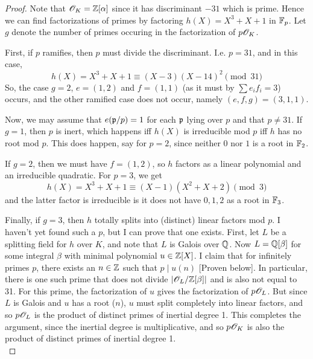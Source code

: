 \begin{proof}
	Note that $\mathscr{O}_K = \mathbb{Z}[\alpha]$ since it has discriminant $-31$ which is prime. Hence we can find factorizations of primes by factoring $h(X) = X^3+X+1$ in $\mathbb{F}_p$. Let $g$ denote the number of primes occuring in the factorization of $p\mathscr{O}_K$.
	
	First, if $p$ ramifies, then $p$ must divide the discriminant. I.e. $p=31$, and in this case,
	\[ h(X) = X^3+X+1 \equiv (X-3)(X-14)^2 \pmod{31} \]
	So, the case $g = 2$, $e = (1,2)$ and $f = (1,1)$ (as it must by $\sum e_if_i = 3$) occurs, and the other ramified case does not occur, namely $(e,f,g) = (3,1,1)$.
	
	Now, we may assume that $e(\mathfrak{p}/p) = 1$ for each $\mathfrak{p}$ lying over $p$ and that $p \neq 31$. If $g=1$, then $p$ is inert, which happens iff $h(X)$ is irreducible mod $p$ iff $h$ has no root mod $p$. This does happen, say for $p = 2$, since neither $0$ nor $1$ is a root in $\mathbb{F}_2$.
	
	If $g = 2$, then we must have $f = (1,2)$, so $h$ factors as a linear polynomial and an irreducible quadratic. For $p = 3$, we get
	\[ h(X) = X^3+X+1 \equiv (X-1)(X^2+X+2) \pmod{3} \]
	and the latter factor is irreducible is it does not have $0,1,2$ as a root in $\mathbb{F}_3$.
	
	Finally, if $g=3$, then $h$ totally splits into (distinct) linear factors mod $p$. I haven't yet found such a $p$, but I can prove that one exists. First, let $L$ be a splitting field for $h$ over $K$, and note that $L$ is Galois over $\mathbb{Q}$. Now $L = \mathbb{Q}[\beta]$ for some integral $\beta$ with minimal polynomial $u \in \mathbb{Z}[X]$. I claim that for infinitely primes $p$, there exists an $n \in \mathbb{Z}$ such that $p \mid u(n)$ [Proven below]. In particular, there is one such prime that does not divide $|\mathscr{O}_L/\mathbb{Z}[\beta]|$ and is also not equal to 31. For this prime, the factorization of $u$ gives the factorization of $p\mathscr{O}_L$. But since $L$ is Galois and $u$ has a root ($n$), $u$ must split completely into linear factors, and so $p\mathscr{O}_L$ is the product of distinct primes of inertial degree 1. This completes the argument, since the inertial degree is multiplicative, and so $p\mathscr{O}_K$ is also the product of distinct primes of inertial degree 1. \\
	

\end{proof}

